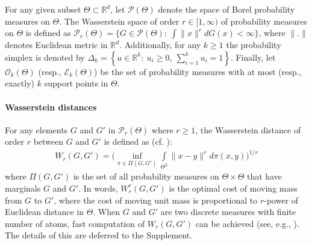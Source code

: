 
For any given subset $\Theta \subset \mathbb{R}^{d}$, let $
\mathcal{P}(\Theta)$ denote the space of Borel probability measures on $\Theta$. 
The Wasserstein space of order $r \in [1,\infty)$ of probability measures on $\Theta$ is defined as
$\mathcal{P}_{r}(\Theta)=\biggr\{G \in \mathcal{P}(\Theta): \ \int \limits {\|x\|^{r}}dG(x)<\infty \biggr\}$,
where $\|.\|$ denotes Euclidean metric in $\mathbb{R}^{d}$. Additionally, for any $k \geq 
1$ the probability simplex is denoted by $\Delta_{k}=\left\{u \in \mathbb{R}^{k}: \ u_{i} \geq 0, \ 
\sum \limits_{i=1}^{k}{u_{i}}=1 \right\}$. Finally, let $\mathcal{O}_{k}(\Theta)$ 
(resp., $\mathcal{E}_{k}(\Theta)$) 
be the set of probability 
measures with at most (resp., exactly) $k$ support points in $\Theta$.

\paragraph{Wasserstein distances}
For any elements $G$ and $G'$ in $\mathcal{P}_{r}(\Theta)$ where $r \geq 1$, the 
Wasserstein distance of order $r$ between $G$ and $G'$ is defined as (cf. \citep{Villani-03}):
\vspace{-6pt}
\begin{eqnarray}
W_{r}(G,G')=\biggr(\mathop {\inf }\limits_{\pi \in \Pi(G,G')}{\int \limits_{\Theta^{2}}{\|x-y\|^{r}}d\pi(x,y)}\biggr)^{1/r} \nonumber
\end{eqnarray}
where $\Pi(G,G')$ is the set of all probability measures on $\Theta \times \Theta$ that have 
marginals $G$ and $G'$. 
In words, $W_r^r(G,G')$ is
the optimal cost of moving mass from $G$ to $G'$, where the cost of moving unit mass is
proportional to $r$-power of Euclidean distance in $\Theta$. 
When $G$ and $G'$ are two discrete measures with finite number 
of atoms, fast computation of $W_r(G,G')$ can be achieved (see, e.g., \cite{Cuturi-2013}). 
The details of this are deferred to the Supplement.
 
